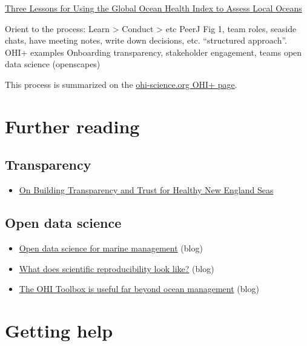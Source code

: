 \documentclass[
]{book}
\providecommand{\tightlist}{%
  \setlength{\itemsep}{0pt}\setlength{\parskip}{0pt}}
\begin{document}
\href{https://ohi-science.org/news/three-lessons-global}{Three Lessons for Using the Global Ocean Health Index to Assess Local Oceans}

Orient to the process: Learn \textgreater{} Conduct \textgreater{} etc
PeerJ Fig 1, team roles, seaside chats, have meeting notes, write down decisions, etc. ``structured approach''.
OHI+ examples
Onboarding
transparency, stakeholder engagement, teams open data science (openscapes)

This process is summarized on the \href{https://ohi-science.org/projects/ohi-plus/}{ohi-science.org OHI+ page}.

\hypertarget{further-reading}{%
\section{Further reading}\label{further-reading}}

\hypertarget{transparency}{%
\subsection{Transparency}\label{transparency}}

\begin{itemize}
\tightlist
\item
  \href{https://ohi-science.org/news/transparent-trust-new-england-seas}{On Building Transparency and Trust for Healthy New England Seas}
\end{itemize}

\hypertarget{open-data-science}{%
\subsection{Open data science}\label{open-data-science}}

\begin{itemize}
\tightlist
\item
  \href{https://ohi-science.org/news/ohi-and-open-data-science}{Open data science for marine management} (blog)
\item
  \href{https://ohi-science.org/news/scientific-reproducibility-with-fellows}{What does scientific reproducibility look like?} (blog)
\item
  \href{https://ohi-science.org/news/what-is-the-ohi-toolbox}{The OHI Toolbox is useful far beyond ocean management} (blog)
\end{itemize}

\hypertarget{getting-help}{%
\section{Getting help}\label{getting-help}}
\end{document}
